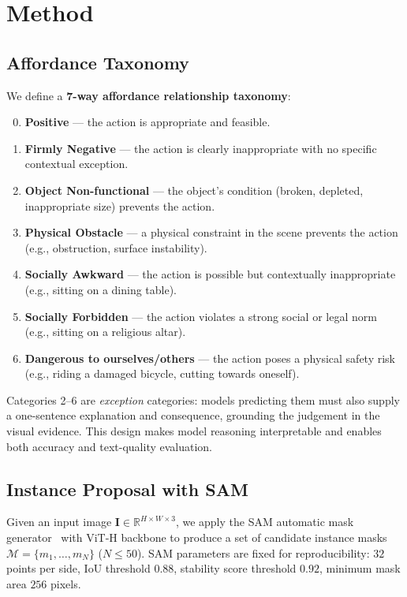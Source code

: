 \documentclass[runningheads]{llncs}
\begin{document}
\section{Method}
\label{sec:method}

\subsection{Affordance Taxonomy}
\label{sec:taxonomy}

We define a \textbf{7-way affordance relationship taxonomy}:

\begin{enumerate}
  \setcounter{enumi}{-1}
  \item \textbf{Positive} — the action is appropriate and feasible.
  \item \textbf{Firmly Negative} — the action is clearly inappropriate
    with no specific contextual exception.
  \item \textbf{Object Non-functional} — the object's condition (broken,
    depleted, inappropriate size) prevents the action.
  \item \textbf{Physical Obstacle} — a physical constraint in the scene
    prevents the action (e.g., obstruction, surface instability).
  \item \textbf{Socially Awkward} — the action is possible but
    contextually inappropriate (e.g., sitting on a dining table).
  \item \textbf{Socially Forbidden} — the action violates a strong social
    or legal norm (e.g., sitting on a religious altar).
  \item \textbf{Dangerous to ourselves/others} — the action poses a
    physical safety risk (e.g., riding a damaged bicycle, cutting towards
    oneself).
\end{enumerate}

Categories 2--6 are \emph{exception} categories: models predicting them
must also supply a one-sentence explanation and consequence, grounding the
judgement in the visual evidence. This design makes model reasoning
interpretable and enables both accuracy and text-quality evaluation.

\subsection{Instance Proposal with SAM}
\label{sec:sam}

Given an input image $\mathbf{I} \in \mathbb{R}^{H \times W \times 3}$,
we apply the SAM automatic mask generator~\cite{kirillov2023sam} with
ViT-H backbone to produce a set of candidate instance masks
$\mathcal{M} = \{m_1, \ldots, m_N\}$ ($N \leq 50$). SAM parameters are
fixed for reproducibility: $32$ points per side, IoU threshold $0.88$,
stability score threshold $0.92$, minimum mask area $256$ pixels.
\end{document}
